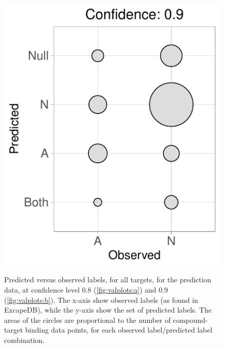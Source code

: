 \documentclass[utf8]{frontiersSCNS} %
\begin{document}
\begin{figure}[h!]
\begin{minipage}[c]{0.38\textwidth}
{        \includegraphics[width=1\textwidth]{figures/validation_plots/alltargets_0p9_valplot.pdf}
    }\label{fig:valplots:b}
\end{minipage}
    \caption{Predicted versus observed labels, for all targets, for the
    prediction data, at confidence level 0.8 (\ref{fig:valplots:a}) and 0.9
    (\ref{fig:valplots:b}). The x-axis show observed labels (as found in
    ExcapeDB), while the y-axis show the set of predicted labels. The areas of
    the circles are proportional to the number of compound-target binding data
    points, for each observed label/predicted label combination.}
    \label{fig:valplots}
\end{figure}
\end{document}
